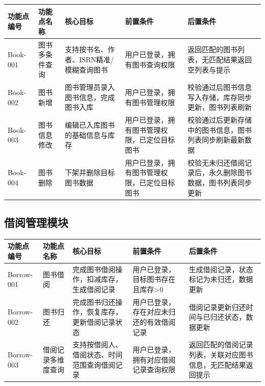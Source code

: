 \documentclass[12pt, a4paper]{article}
\begin{document}
\begin{table}[H]
    \centering
    \begin{tabularx}{\linewidth}{|l|l|X|X|X|}
        \hline
        功能点编号 & 功能点名称 & 核心目标 & 前置条件 & 后置条件 \\
        \hline
        Book-001 & 图书多条件查询 & 支持按书名、作者、ISBN精准/模糊查询图书 & 用户已登录，拥有图书查询权限 & 返回匹配的图书列表，无匹配结果返回空列表与提示 \\
        \hline
        Book-002 & 图书新增 & 图书管理员录入图书信息，完成图书入库 & 用户已登录，拥有图书管理权限 & 校验通过后图书信息写入存储，库存同步更新，图书列表刷新 \\
        \hline
        Book-003 & 图书信息修改 & 编辑已入库图书的基础信息与库存 & 用户已登录，拥有图书管理权限，已定位目标图书 & 校验通过后更新存储中的图书信息，图书列表同步刷新最新数据 \\
        \hline
        Book-004 & 图书删除 & 下架并删除目标图书数据 & 用户已登录，拥有图书管理权限，已定位目标图书 & 校验无未归还借阅记录后，永久删除图书数据，图书列表同步更新 \\
        \hline
    \end{tabularx}
\end{table}

\subsection{借阅管理模块}

\begin{table}[H]
    \centering
    \begin{tabularx}{\linewidth}{|l|l|X|X|X|}
        \hline
        功能点编号 & 功能点名称 & 核心目标 & 前置条件 & 后置条件 \\
        \hline
        Borrow-001 & 图书借阅 & 完成图书借阅操作，扣减库存，生成借阅记录 & 用户已登录，目标图书存在且库存>0 & 生成借阅记录，状态标记为未归还，数据更新 \\
        \hline
        Borrow-002 & 图书归还 & 完成图书归还操作，恢复库存，更新借阅记录状态 & 用户已登录，存在对应未归还的有效借阅记录 & 借阅记录更新归还时间与已归还状态，数据更新 \\
        \hline
        Borrow-003 & 借阅记录多维度查询 & 支持按借阅人、借阅状态、时间范围查询借阅记录 & 用户已登录，拥有对应借阅记录查询权限 & 返回匹配的借阅记录列表，关联对应图书信息，无匹配结果返回提示 \\
        \hline
    \end{tabularx}
\end{table}
\end{document}
